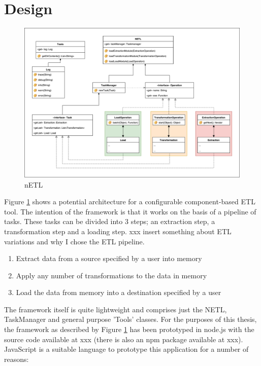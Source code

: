 \section{Design}

\begin{figure}[h]
    \centering
    \includegraphics[scale=0.4]{./resources/figures/netlUML}
    \caption[nETL]{nETL}
    \label{nETL}
\end{figure}

Figure \ref{nETL} shows a potential architecture for a configurable component-based ETL tool. The intention of the framework is that it works on the basis of a pipeline of tasks. These tasks can be divided into 3 steps; an extraction step, a transformation step and a loading step. xxx insert something about ETL variations and why I chose the ETL pipeline.

\begin{enumerate}
    \item Extract data from a source specified by a user into memory
    \item Apply any number of transformations to the data in memory
    \item Load the data from memory into a destination specified by a user
\end{enumerate}

The framework itself is quite lightweight and comprises just the NETL, TaskManager and general purpose 'Tools' classes. For the purposes of this thesis, the framework as described by Figure \ref{nETL} has been prototyped in node.js with the source code available at xxx (there is also an npm package available at xxx). JavaScript is a suitable language to prototype this application for a number of reasons:

